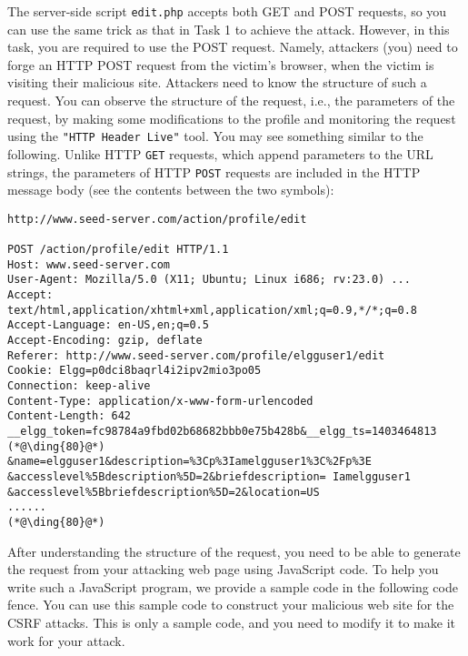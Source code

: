 The server-side script {\tt edit.php} accepts both GET and POST requests,
so you can use the same trick as that in Task 1 to achieve the attack.
However, in this task, you are required to use the POST request. 
Namely, attackers (you) need to forge an HTTP POST request from the victim's
browser, when the victim is visiting their malicious site. 
Attackers need to know the structure of such a request.
You can observe the
structure of the request, i.e.,  the parameters of the request, by making
some modifications to the profile and monitoring the request using
the \texttt{"HTTP Header Live"} tool. 
You may see something similar to
the following. Unlike HTTP {\tt GET} requests, which append 
parameters to the URL strings, the parameters of HTTP {\tt POST} requests are 
included in the HTTP message body (see the contents between the two 
 symbols): 


\begin{lstlisting}
http://www.seed-server.com/action/profile/edit

POST /action/profile/edit HTTP/1.1
Host: www.seed-server.com
User-Agent: Mozilla/5.0 (X11; Ubuntu; Linux i686; rv:23.0) ...
Accept: text/html,application/xhtml+xml,application/xml;q=0.9,*/*;q=0.8
Accept-Language: en-US,en;q=0.5
Accept-Encoding: gzip, deflate
Referer: http://www.seed-server.com/profile/elgguser1/edit
Cookie: Elgg=p0dci8baqrl4i2ipv2mio3po05
Connection: keep-alive
Content-Type: application/x-www-form-urlencoded
Content-Length: 642
__elgg_token=fc98784a9fbd02b68682bbb0e75b428b&__elgg_ts=1403464813  (*@\ding{80}@*) 
&name=elgguser1&description=%3Cp%3Iamelgguser1%3C%2Fp%3E
&accesslevel%5Bdescription%5D=2&briefdescription= Iamelgguser1
&accesslevel%5Bbriefdescription%5D=2&location=US
......                                                              (*@\ding{80}@*)
\end{lstlisting}


After understanding the structure of the request, you need to 
be able to generate the request from your attacking web page
using JavaScript code. 
To help you write such a JavaScript program,  we provide a 
sample code in the following code fence. You can use this sample code to construct your malicious web site
for the CSRF attacks. This is only a sample code, and you need to modify it to 
make it work for your attack.


